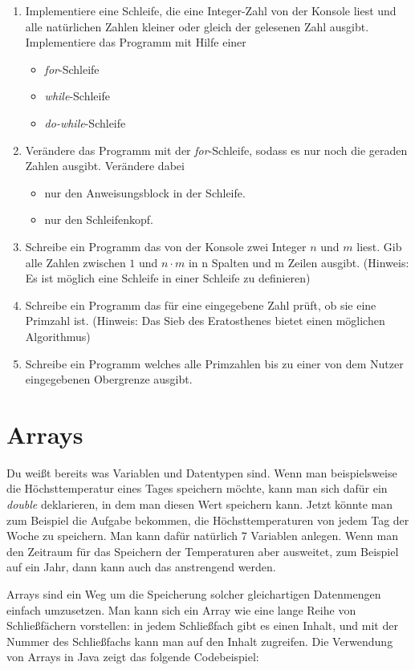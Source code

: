 \begin{enumerate}
	\item Implementiere eine Schleife, die eine Integer-Zahl von der Konsole liest und alle natürlichen Zahlen kleiner oder gleich der gelesenen Zahl ausgibt. Implementiere das Programm mit Hilfe einer
	\begin{itemize}
		\item \textit{for}-Schleife
		\item \textit{while}-Schleife
		\item \textit{do-while}-Schleife
	\end{itemize}
	\item Verändere das Programm mit der \textit{for}-Schleife, sodass es nur noch die geraden Zahlen ausgibt. Verändere dabei
	\begin{itemize}
		\item nur den Anweisungsblock in der Schleife.
		\item nur den Schleifenkopf.
	\end{itemize}
	\item Schreibe ein Programm das von der Konsole zwei Integer $n$ und $m$ liest. Gib alle Zahlen zwischen $1$ und $n\cdot m$ in n Spalten und m Zeilen ausgibt. (Hinweis: Es ist möglich eine Schleife in einer Schleife zu definieren)
	\item Schreibe ein Programm das für eine eingegebene Zahl prüft, ob sie eine Primzahl ist. (Hinweis: Das Sieb des Eratosthenes bietet einen möglichen Algorithmus)
	\item Schreibe ein Programm welches alle Primzahlen bis zu einer von dem Nutzer eingegebenen Obergrenze ausgibt.
\end{enumerate}

\section{Arrays}

Du weißt bereits was Variablen und Datentypen sind. Wenn man beispielsweise die Höchsttemperatur eines Tages speichern möchte, kann man sich dafür ein \textit{double} deklarieren, in dem man diesen Wert speichern kann. Jetzt könnte man zum Beispiel die Aufgabe bekommen, die Höchsttemperaturen von jedem Tag der Woche zu speichern. Man kann dafür natürlich 7 Variablen anlegen. Wenn man den Zeitraum für das Speichern der Temperaturen aber ausweitet, zum Beispiel auf ein Jahr, dann kann auch das anstrengend werden.

Arrays sind ein Weg um die Speicherung solcher gleichartigen Datenmengen einfach umzusetzen. Man kann sich ein Array wie eine lange Reihe von Schließfächern vorstellen: in jedem Schließfach gibt es einen Inhalt, und mit der Nummer des Schließfachs kann man auf den Inhalt zugreifen. Die Verwendung von Arrays in Java zeigt das folgende Codebeispiel:


